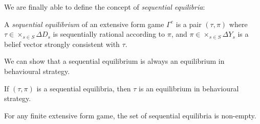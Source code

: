 We are finally able to define the concept of \emph{sequential equilibria}:
\begin{definition}
A \emph{sequential equilibrium} of an extensive form game $\Gamma^e$ is a pair $(\tau, \pi)$ where $\tau \in \times_{s \in S} \Delta D_s$ is sequentially rational according to $\pi$, and $\pi \in \times_{s \in S} \Delta Y_s$ is a belief vector strongly consistent with $\tau$. 
\label{ch4:def:SeqEq}
\end{definition}

We can show that a sequential equilibrium is always an equilibrium in behavioural strategy.

\begin{theorem}
If $(\tau, \pi)$ is a sequential equilibria, then $\tau$ is an equilibrium in behavioural strategy.
\end{theorem}

\begin{theorem}
For any finite extensive form game, the set of sequential equilibria is non-empty.
\end{theorem}

